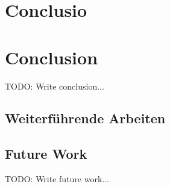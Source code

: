 \ifisGerman
    \chapter{Conclusio}
\else
    \chapter{Conclusion}
\fi
\label{sec:conclusion}

TODO: Write conclusion...


\ifisGerman
    \section{Weiterführende Arbeiten}
\else
    \section{Future Work}
\fi

TODO: Write future work...


